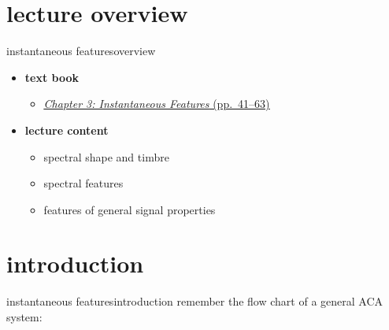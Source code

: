     \section[overview]{lecture overview}
        \begin{frame}{instantaneous features}{overview}
            \begin{itemize}
                \item   \textbf{text book}  
                    \begin{itemize}
                        \item   \href{http://ieeexplore.ieee.org/xpl/ebooks/bookPdfWithBanner.jsp?fileName=6331120.pdf&bkn=6266785&pdfType=chapter}{\underline{\textit{Chapter 3: Instantaneous Features} (pp.~41--63)}}
                    \end{itemize}
                \bigskip
                \item<2->   \textbf{lecture content}
                    \begin{itemize}
                        \item<2->   spectral shape and timbre
                        \item<3->   spectral features
                        \item<4->   features of general signal properties
                    \end{itemize}
            \end{itemize}
        \end{frame}

    \section[intro]{introduction}
        \begin{frame}{instantaneous features}{introduction}
            remember the flow chart of a general ACA system:
            \vspace{-2mm}
            \begin{figure}
                
            \end{figure}
        \end{frame}
        
